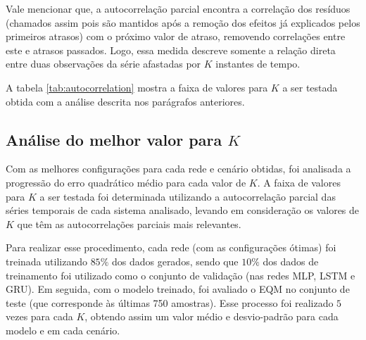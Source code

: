 \documentclass[a4paper, 12pt]{article}
\begin{document}
Vale mencionar que, a autocorrelação parcial encontra a correlação dos resíduos (chamados assim pois são mantidos após a remoção dos efeitos já explicados pelos primeiros atrasos) com o próximo valor de atraso, removendo correlações entre este e atrasos passados. Logo, essa medida descreve somente a relação direta entre duas observações da série afastadas por $K$ instantes de tempo.

A tabela \ref{tab:autocorrelation} mostra a faixa de valores para $K$ a ser testada obtida com a análise descrita nos parágrafos anteriores.
\begin{table}[H]
\begin{center}
\caption{Faixa de valores inteiros para $K$ a ser testada em cada cenário para todas as redes}
\label{tab:autocorrelation}
\end{center}
\end{table}

\subsection{Análise do melhor valor para $K$}

Com as melhores configurações para cada rede e cenário obtidas, foi analisada a progressão do erro quadrático médio para cada valor de $K$. A faixa de valores para $K$ a ser testada foi determinada utilizando a autocorrelação parcial das séries temporais de cada sistema analisado, levando em consideração os valores de $K$ que têm as autocorrelações parciais mais relevantes.

Para realizar esse procedimento, cada rede (com as configurações ótimas) foi treinada utilizando $85\%$ dos dados gerados, sendo que $10\%$ dos dados de treinamento foi utilizado como o conjunto de validação (nas redes MLP, LSTM e GRU). Em seguida, com o modelo treinado, foi avaliado o EQM no conjunto de teste (que corresponde às últimas 750 amostras). Esse processo foi realizado $5$ vezes para cada $K$, obtendo assim um valor médio e desvio-padrão para cada modelo e em cada cenário. 
\end{document}
